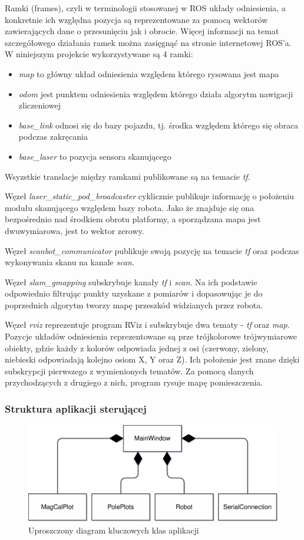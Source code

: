 Ramki (frames), czyli w terminologii stosowanej w ROS układy odniesienia, a konkretnie ich względna pozycja są reprezentowane za pomocą wektorów zawierających dane o przesunięciu jak i obrocie. Więcej informacji na temat szczegółowego działania ramek można zasięgnąć na stronie internetowej ROS'a\cite{ros}. W niniejszym projekcie wykorzystywane są 4 ramki:
\begin{itemize}
    \item \emph{map} to główny układ odniesienia względem którego rysowana jest mapa
    \item \emph{odom} jest punktem odniesienia względem którego działa algorytm nawigacji zliczeniowej
    \item \emph{base\_link} odnosi się do bazy pojazdu, tj. środka względem którego się obraca podczas zakręcania
    \item \emph{base\_laser} to pozycja sensora skanującego
\end{itemize}
Wsyzstkie translacje między ramkami publikowane są na temacie \emph{tf}.

Węzeł \emph{laser\_static\_pod\_broadcaster} cyklicznie publikuje informację o położeniu modułu skanującego względem bazy robota. Jako że znajduje się ona bezpośrednio nad środkiem obrotu platformy, a sporządzana mapa jest dwuwymiarowa, jest to wektor zerowy.

Węzeł \emph{scanbot\_communicator} publikuje swoją pozycję na temacie \emph{tf} oraz podczas wykonywania skanu na kanale \emph{scan}.

Węzeł \emph{slam\_gmapping} subskrybuje kanały \emph{tf} i \emph{scan}. Na ich podstawie odpowiednio filtrując punkty uzyskane z pomiarów i dopasowując je do poprzednich algorytm tworzy mapę przeszkód widzianych przez robota.

Węzeł \emph{rviz} reprezentuje program RViz i subskrybuje dwa tematy - \emph{tf} oraz \emph{map}. Pozycje układów odniesienia reprezentowane są prze trójkolorowe trójwymiarowe obiekty, gdzie każdy z kolorów odpowiada jednej z osi (czerwony, zielony, niebieski odpowiadają kolejno osiom X, Y oraz Z). Ich położenie jest znane dzięki subskrypcji pierwszego z wymienionych tematów. Za pomocą danych przychodzących z drugiego z nich, program rysuje mapę pomieszczenia.


\subsubsection{Struktura aplikacji sterującej}
\begin{figure}[ht]
	\centering
		\includegraphics[width=0.8\linewidth]{rys/pc-application-simplified-uml.pdf}
	\caption{Uproszczony diagram kluczowych klas aplikacji}
	\label{fig:simple-class-diagram}
\end{figure}

